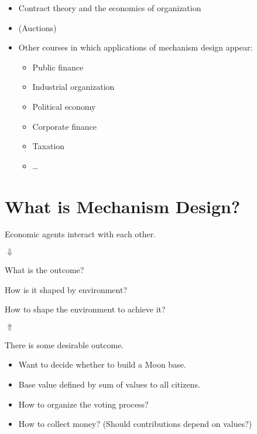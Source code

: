 \documentclass[english]{beamer}		%
\def\lyxframeend{} %
\begin{document}
\begin{itemize}
	\item Contract theory and the economics of organization
	\item (Auctions)
	\item Other courses in which applications of mechanism design appear:
	\begin{itemize}
		\item Public finance
		\item Industrial organization
		\item Political economy
		\item Corporate finance
		\item Taxation
		\item \ldots{}
	\end{itemize}
\end{itemize}
\lyxframeend





\section{What is Mechanism Design?}

\begin{center}
	Economic agents interact with each other.
	\pause
	
	$\Downarrow$
	
	What is the outcome? 
	
	How is it shaped by environment?
\end{center}
\lyxframeend


\begin{center}
	\pause[2] 
	How to shape the environment to achieve it?
	
	$\Uparrow$
	
	\pause[1]
	There is some desirable outcome.
\end{center}
\lyxframeend


\begin{itemize}
	\item Want to decide whether to build a Moon base.
	\item Base value defined by sum of values to all citizens.
	\item How to organize the voting process?
	\item How to collect money? (Should contributions depend on values?)
\end{itemize}
\lyxframeend
\end{document}
